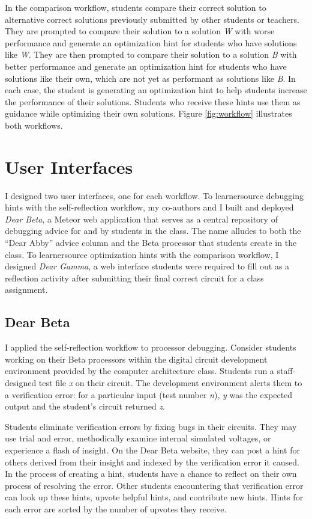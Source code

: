 In the comparison workflow, students compare their correct solution to alternative correct solutions previously submitted by other students or teachers. They are prompted to compare their solution to a solution \textit{W} with worse performance and generate an optimization hint for students who have solutions like \textit{W}. They are then prompted to compare their solution to a solution \textit{B} with better performance and generate an optimization hint for students who have solutions like their own, which are not yet as performant as solutions like \textit{B}. In each case, the student is generating an optimization hint to help students increase the performance of their solutions. Students who receive these hints use them as guidance while optimizing their own solutions. Figure \ref{fig:workflow} illustrates both workflows.

\section{User Interfaces} 
I designed two user interfaces, one for each workflow. To learnersource debugging hints with the self-reflection workflow, my co-authors and I built and deployed {\it Dear Beta}, a Meteor web application that serves as a central repository of debugging advice for and by students in the class. The name alludes to both the ``Dear Abby'' advice column and the Beta processor that students create in the class. To learnersource optimization hints with the comparison workflow, I designed {\it Dear Gamma}, a web interface students were required to fill out as a reflection activity after submitting their final correct circuit for a class assignment.

\subsection{Dear Beta}

I applied the self-reflection workflow to processor debugging. Consider students working on their Beta processors within the digital circuit development environment provided by the computer architecture class. Students run a staff-designed test file {\it x} on their circuit. The development environment alerts them to a verification error: for a particular input (test number {\it n}), {\it y} was the expected output and the student's circuit returned {\it z}. 

Students eliminate verification errors by fixing bugs in their circuits. They may use trial and error, methodically examine internal simulated voltages, or experience a flash of insight. On the Dear Beta website, they can post a hint for others derived from their insight and indexed by the verification error it caused. In the process of creating a hint, students have a chance to reflect on their own process of resolving the error.  Other students encountering that verification error can look up these hints, upvote helpful hints, and contribute new hints. Hints for each error are sorted by the number of upvotes they receive.

